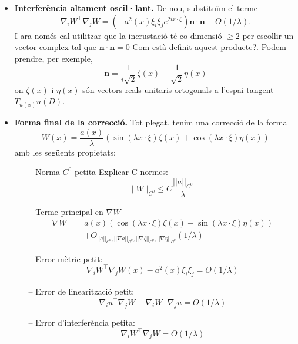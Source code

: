 \begin{itemize}
    \item \textbf{Interferència altament oscil·lant.} De nou, substituïm el terme
    \begin{equation*}
        \nabla_iW^{\intercal}\nabla_jW = (-a^2(x)\xi_i\xi_je^{2ix\cdot\xi})\textbf{n}\cdot\textbf{n} + O(1/\lambda).
    \end{equation*}
    I ara només cal utilitzar que la incrustació té co-dimensió $\ge2$ per escollir un vector complex tal que $\textbf{n}\cdot\textbf{n} = 0$ {\color{blue}Com està definit aquest producte?}. Podem prendre, per exemple, 
    \begin{equation*}
        \textbf{n} = \frac{1}{i\sqrt2}\zeta(x) + \frac{1}{\sqrt2}\eta(x)
    \end{equation*}
    on $\zeta(x)$ i $\eta(x)$ són vectors reals unitaris ortogonals a l'espai tangent $T_{u(x)}u(D)$.
    \item \textbf{Forma final de la correcció.} Tot plegat, tenim una correcció de la forma
    \begin{equation*}
        W(x) = \frac{a(x)}{\lambda}\left( \sin(\lambda x \cdot \xi)\zeta(x) + \cos(\lambda x \cdot \xi)\eta(x) \right)
    \end{equation*}
    amb les següents propietats:
    \begin{itemize}
        \item[--] Norma $C^0$ petita {\color{blue} Explicar C-normes}: $$||W||_{C^0}\le C\frac{||a||_{C^0}}{\lambda}$$
        \item[--] Terme principal en $\nabla W$ 
        \begin{equation*}
            \begin{aligned}
                \nabla W = &a(x)\left( \cos(\lambda x \cdot \xi)\zeta(x) - \sin(\lambda x \cdot \xi)\eta(x) \right) \\
                &+ O_{||a||_{C^0}, ||\nabla a||_{C^0}, ||\nabla\zeta||_{C^0}, ||\nabla\eta||_{C^0}}(1/\lambda)
            \end{aligned}
        \end{equation*}
        \item[--] Error mètric petit: $$\nabla_i W^{\intercal}\nabla_j W(x) -a^2(x)\xi_i\xi_j = O(1/\lambda)$$
        \item[--] Error de linearització petit: $$\nabla_i u ^{\intercal}\nabla_j W + \nabla_iW^{\intercal}\nabla_ju = O(1/\lambda)$$
        \item[--] Error d'interferència petita: $$\nabla_i W ^{\intercal}\nabla_j W = O(1/\lambda)$$
    \end{itemize}
\end{itemize}
